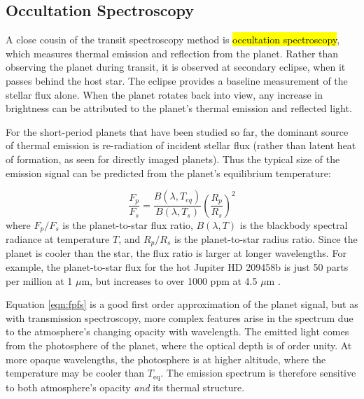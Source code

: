 \documentclass[graybox,natbib,nosecnum]{svmult}
\newcommand{\hbindex}[1]{\hl{#1}\index{#1}}  %
\begin{document}
\subsection{Occultation Spectroscopy}
A close cousin of the transit spectroscopy method is \hbindex{occultation spectroscopy}, which measures thermal emission and reflection from the planet. Rather than observing the planet during transit, it is observed at secondary eclipse, when it passes behind the host star. The eclipse provides a baseline measurement of the stellar flux alone. When the planet rotates back into view, any increase in brightness can be attributed to the planet's thermal emission and reflected light.

For the short-period planets that have been studied so far, the dominant source of thermal emission is re-radiation of incident stellar flux (rather than latent heat of formation, as seen for directly imaged planets). Thus the typical size of the emission signal can be predicted from the planet's equilibrium temperature:

\begin{equation}
\label{eqn:fpfs}
\frac{F_p}{F_s} = \frac{B(\lambda, T_{eq})}{B(\lambda, T_s)}\left(\frac{R_p}{R_s}\right)^2
\end{equation}
where $F_p/F_s$ is the planet-to-star flux ratio, $B(\lambda, T)$ is the blackbody spectral radiance at temperature $T$, and $R_p/R_s$ is the planet-to-star radius ratio. Since the planet is cooler than the star, the flux ratio is larger at longer wavelengths. For example, the planet-to-star flux for the hot Jupiter HD 209458b is just 50 parts per million at 1 $\mu$m, but increases to over 1000 ppm at 4.5 $\mu$m \citep{line16}.

Equation \ref{eqn:fpfs} is a good first order approximation of the planet signal, but as with transmission spectroscopy, more complex features arise in the spectrum due to the atmosphere's changing opacity with wavelength. The emitted light comes from the photosphere of the planet, where the optical depth is of order unity. At more opaque wavelengths, the photosphere is at higher altitude, where the temperature may be cooler than $T_\mathrm{eq}$. The emission spectrum is therefore sensitive to both atmosphere's opacity \emph{and} its thermal structure. 

\end{document}
